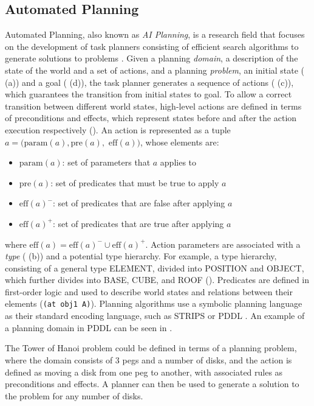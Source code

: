 \subsection{Automated Planning}\label{subsec:AP}
Automated Planning, also known as \textit{AI Planning}, is a research field that focuses on the development of task planners consisting of efficient search algorithms to generate solutions to problems \cite{ghallab2004automated}.
Given a planning \textit{domain}, \ie a description of the state of the world and a set of actions, and a planning \textit{problem}, \ie an initial state ( (a)) and a goal ( (d)), the task planner generates a sequence of actions ( (c)), which guarantees the transition from initial states to goal.
To allow a correct transition between different world states, high-level actions are defined in terms of preconditions and effects, which represent states before and after the action execution respectively ().
An action is represented as a tuple $a = (\text{param}(a), \text{pre}(a),$ $\text{eff}(a))$, whose elements are:
\begin{itemize}
	\item $\text{param}(a)$: set of parameters that $a$ applies to
	\item $\text{pre}(a)$: set of predicates that must be true to apply $a$
	\item $\text{eff}(a)^{-}$: set of predicates that are false after applying $a$
	\item $\text{eff}(a)^{+}$: set of predicates that are true after applying $a$
\end{itemize}
where $\text{eff}(a) = \text{eff}(a)^{-} \cup \text{eff}(a)^{+}$. 
Action parameters are associated with a \textit{type} ( (b)) and a potential type hierarchy.
For example, a type hierarchy, consisting of a general type ELEMENT, divided into POSITION and OBJECT, which further divides into BASE, CUBE, and ROOF ().
Predicates are defined in first-order logic and used to describe world states and relations between their elements (\eg \texttt{(at obj1 A)}).
Planning algorithms use a symbolic planning language as their standard encoding language, such as STRIPS \cite{fikes1971strips} or PDDL \cite{ghallab2004automated}.
An example of a planning domain in PDDL can be seen in .

The Tower of Hanoi problem could be defined in terms of a planning problem, where the domain consists of 3 pegs and a number of disks, and the action is defined as moving a disk from one peg to another, with associated rules as preconditions and effects.
A planner can then be used to generate a solution to the problem for any number of disks.

